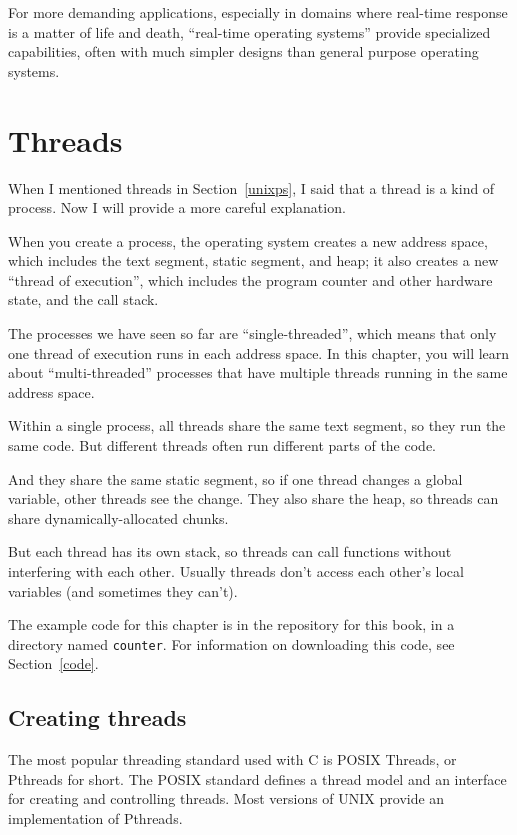 \documentclass[12pt]{book}
\begin{document}
{\begin{itemize}
\end{itemize}

For more demanding applications, especially in domains where real-time
response is a matter of life and death, ``real-time operating
  systems'' provide specialized capabilities, often with much simpler
designs than general purpose operating systems.



\chapter{Threads}

When I mentioned threads in Section~\ref{unixps}, I said that a thread
is a kind of process.  Now I will provide a more careful explanation.

When you create a process, the operating system creates a new address
space, which includes the text segment, static segment, and heap; it
also creates a new ``thread of execution'', which includes the program
counter and other hardware state, and the call stack.

The processes we have seen so far are ``single-threaded'', which means
that only one thread of execution runs in each address space.  In this
chapter, you will learn about ``multi-threaded'' processes that have
multiple threads running in the same address space.

Within a single process, all threads share the same text segment, so
they run the same code.  But different threads often run different parts
of the code.

And they share the same static segment, so if one thread changes a
global variable, other threads see the change.  They also share the heap,
so threads can share dynamically-allocated chunks.

But each thread has its own stack, so threads can call functions without
interfering with each other.  Usually threads don't access each
other's local variables (and sometimes they can't).

The example code for this chapter is in the repository for this book,
in a directory named {\tt counter}.  For information on downloading
this code, see Section~\ref{code}.


\section{Creating threads}

The most popular threading standard used with C is POSIX Threads, or Pthreads for short.  The POSIX standard defines a thread model and an interface for creating and controlling threads.  Most versions of UNIX provide an implementation of Pthreads.

}
\end{document}
